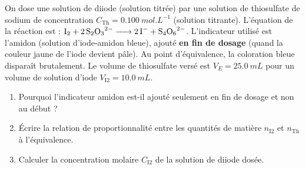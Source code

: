 \documentclass[11pt]{article}
\begin{document}
\begin{exercice}
On dose une solution de diiode  (solution titrée) par une solution de thiosulfate de sodium  de concentration $C_{\text{Th}} = \SI{0,100}{mol.L^{-1}}$ (solution titrante).
L'équation de la réaction est : $\ce{I2 + 2 S2O3^{2-} -> 2 I^- + S4O6^{2-}}$.
L'indicateur utilisé est l'amidon (solution d'iode-amidon bleue), ajouté \textbf{en fin de dosage} (quand la couleur jaune de l'iode devient pâle).
Au point d'équivalence, la coloration bleue disparaît brutalement. Le volume de thiosulfate versé est $V_E = \SI{25,0}{mL}$ pour un volume de solution d'iode $V_{\text{I2}} = \SI{10,0}{mL}$.
\begin{enumerate}
    \item Pourquoi l'indicateur amidon est-il ajouté seulement en fin de dosage et non au début ?
    \item Écrire la relation de proportionnalité entre les quantités de matière $n_{\text{I2}}$ et $n_{\text{Th}}$ à l'équivalence.
    \item Calculer la concentration molaire $C_{\text{I2}}$ de la solution de diiode dosée.
\end{enumerate}
\end{exercice}
\end{document}
